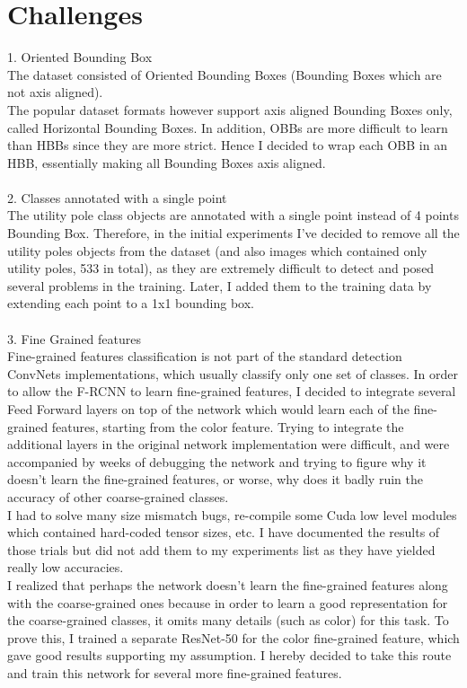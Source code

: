 \documentclass[]{article}
\begin{document}
\section{Challenges}
1. Oriented Bounding Box \\
The dataset consisted of Oriented Bounding Boxes (Bounding Boxes which are not axis aligned). \\
The popular dataset formats however support axis aligned Bounding Boxes only, called Horizontal Bounding Boxes. 
In addition, OBBs are more difficult to learn than HBBs since they are more strict. Hence I decided to wrap each OBB in an HBB, essentially making all Bounding Boxes axis aligned.  
\\\\
2. Classes annotated with a single point\\
The utility pole class objects are annotated with a single point instead of 4 points Bounding Box. Therefore, in the initial experiments I've decided to remove all the utility poles objects from the dataset (and also images which contained only utility poles, 533 in total), as they are extremely difficult to detect and posed several problems in the training. Later, I added them to the training data by extending each point to a 1x1 bounding box.
\\\\
3. Fine Grained features\\
Fine-grained features classification is not part of the standard detection ConvNets implementations, which usually classify only one set of classes.
In order to allow the F-RCNN \cite{fasterrcnn} to learn fine-grained features, I decided to integrate several Feed Forward layers on top of the network which would learn each of the fine-grained features, starting from the color feature.
Trying to integrate the additional layers in the original network implementation were difficult, and were accompanied by weeks of debugging the network and trying to figure why it doesn't learn the fine-grained features, or worse, why does it badly ruin the accuracy of other coarse-grained classes.\\
I had to solve many size mismatch bugs, re-compile some Cuda low level modules which contained hard-coded tensor sizes, etc.
I have documented the results of those trials but did not add them to my experiments list as they have yielded really low accuracies.\\
I realized that perhaps the network doesn't learn the fine-grained features along with the coarse-grained ones because in order to learn a good representation for the coarse-grained classes, it omits many details (such as color) for this task. To prove this, I trained a separate ResNet-50 \cite{resnet} for the color fine-grained feature, which gave good results supporting my assumption. I hereby decided to take this route and train this network for several more fine-grained features.
\end{document}

